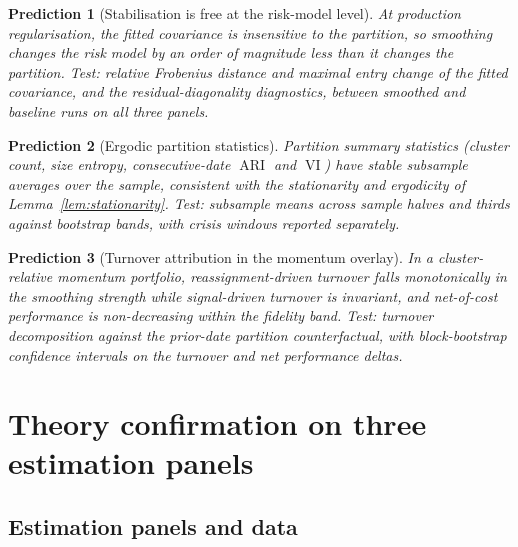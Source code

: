 \documentclass{rQUF2e}
\theoremstyle{plain}
\newtheorem{prediction}{Prediction}
\theoremstyle{remark}
\newcommand{\ARI}{\operatorname{ARI}}
\newcommand{\VI}{\operatorname{VI}}
\begin{document}
\begin{prediction}[Stabilisation is free at the risk-model level]
\label{pred:invariance}
At production regularisation, the fitted covariance is insensitive to the
partition, so smoothing changes the risk model by an order of magnitude less
than it changes the partition. Test: relative Frobenius distance and maximal
entry change of the fitted covariance, and the residual-diagonality
diagnostics, between smoothed and baseline runs on all three panels.
\end{prediction}

\begin{prediction}[Ergodic partition statistics]
\label{pred:ergodicity}
Partition summary statistics (cluster count, size entropy, consecutive-date
$\ARI$ and $\VI$) have stable subsample averages over the sample, consistent
with the stationarity and ergodicity of Lemma~\ref{lem:stationarity}. Test:
subsample means across sample halves and thirds against bootstrap bands, with
crisis windows reported separately.
\end{prediction}

\begin{prediction}[Turnover attribution in the momentum overlay]
\label{pred:turnover}
In a cluster-relative momentum portfolio, reassignment-driven turnover falls
monotonically in the smoothing strength while signal-driven turnover is
invariant, and net-of-cost performance is non-decreasing within the fidelity
band. Test: turnover decomposition against the prior-date partition
counterfactual, with block-bootstrap confidence intervals on the turnover and
net performance deltas.
\end{prediction}

\section{Theory confirmation on three estimation panels}
\label{sec:confirmation}

\subsection{Estimation panels and data}
\label{sec:panels}
\end{document}
